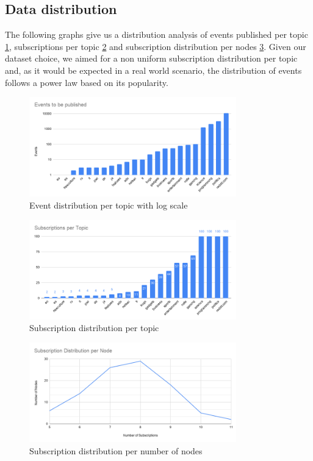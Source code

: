 \subsection{Data distribution}\label{subsec:data-distribution}

The following graphs give us a distribution analysis of events published per
topic \ref{fig:events-to-be-publisher-per-topic}, subscriptions per topic
\ref{fig:subscriptions-per-topic} and subscription distribution per nodes
\ref{fig:subscription-distribution-per-node}. Given our dataset choice, we
aimed for a non uniform subscription distribution per topic and, as it would be
expected in a real world scenario, the distribution of events follows a power
law based on its popularity. 

\begin{figure}[hb!]
  \centering
  \includegraphics[width=0.8\textwidth]{img/events-to-be-publisher-per-topic.png}
  \caption{Event distribution per topic with log scale}
  \label{fig:events-to-be-publisher-per-topic}
\end{figure}

\begin{figure}[hb!]
  \centering
  \includegraphics[width=0.8\textwidth]{img/subscriptions-per-topic.png}
  \caption{Subscription distribution per topic}
  \label{fig:subscriptions-per-topic}
\end{figure}

\begin{figure}[hb!]
  \centering
  \includegraphics[width=0.8\textwidth]{img/subscription-distribution-per-node.png}
  \caption{Subscription distribution per number of nodes}
  \label{fig:subscription-distribution-per-node}
\end{figure}


